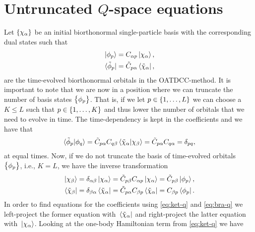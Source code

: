     \section{Untruncated $Q$-space equations}
        \label{app:untruncated-q-space}
        Let $\left\{ \chi_{\alpha} \right\}$ be an initial biorthonormal single-particle
        basis with the corresponding dual states such that
        \begin{gather}
            \ket*{\phi_p} = C_{\alpha p} \ket*{\chi_{\alpha}}, \\
            \bra*{\tilde{\phi}_p} = \tilde{C}_{p \alpha}
            \bra*{\tilde{\chi}_{\alpha}},
        \end{gather}
        are the time-evolved biorthonormal orbitals in the OATDCC-method.
        It is important to note that we are now in a position where we can
        truncate the number of basis states $\left\{ \phi_p \right\}$.
        That is, if we let $p \in \left\{ 1, \dots, L \right\}$ we can choose a $K \leq L$
        such that $p \in \left\{ 1, \dots, K \right\}$ and thus lower the number of
        orbitals that we need to evolve in time.
        The time-dependency is kept in the coefficients and we have that
        \begin{align}
            \braket*{\tilde{\phi}_p}{\phi_q}
            = \tilde{C}_{p\alpha} C_{q\beta}
            \braket*{\tilde{\chi}_{\alpha}}{\chi_{\beta}}
            = \tilde{C}_{p\alpha} C_{q\alpha}
            = \delta_{pq},
        \end{align}
        at equal times.
        Now, if we do not truncate the basis of time-evolved orbitals
        $\left\{ \phi_p \right\}$, i.e., $K = L$, we have the inverse transformation
        \begin{gather}
            \ket*{\chi_{\beta}}
            = \delta_{\alpha \beta} \ket*{\chi_{\alpha}}
            = \tilde{C}_{p \beta} C_{\alpha p} \ket*{\chi_{\alpha}}
            = \tilde{C}_{p \beta} \ket*{\phi_p}, \\
            \bra*{\tilde{\chi}_{\beta}}
            = \delta_{\beta \alpha} \bra*{\tilde{\chi}_{\alpha}}
            = \tilde{C}_{p \alpha} C_{\beta p} \bra*{\tilde{\chi}_{\alpha}}
            = C_{\beta p} \bra*{\phi_p}.
        \end{gather}
        In order to find equations for the coefficients using \autoref{eq:ket-q}
        and \autoref{eq:bra-q} we left-project the former equation with
        $\bra*{\tilde{\chi}_{\alpha}}$ and right-project the latter equation with
        $\ket*{{\chi}_{\alpha}}$.
        Looking at the one-body Hamiltonian term from \autoref{eq:ket-q} we have
